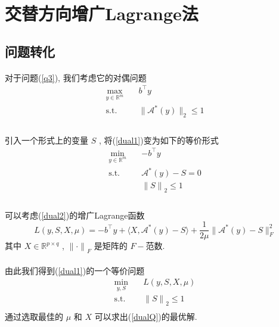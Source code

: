 \documentclass[a4paper, UTF8]{ctexart}				%
\numberwithin{equation}{section}				%
\begin{document}
	\section{交替方向增广Lagrange法}
		\subsection{问题转化}
			\paragraph{}
				\quad 对于问题(\ref{q3}), 我们考虑它的对偶问题
				\begin{equation}
					\begin{split}\label{dual1}
						\max_{y \in \mathbb{R}^{m}} \quad
							& b^\top y\\
						\text{s.t.} \quad
							& \lVert{\mathcal{A}^*(y)}\rVert_2 \le 1\\
					\end{split}
				\end{equation}

			\paragraph{}
				\quad 引入一个形式上的变量 $S$ , 将(\ref{dual1})变为如下的等价形式
				\begin{equation}
					\begin{split}\label{dual2}
						\min_{y \in \mathbb{R}^{m}} \quad
							& -b^\top y\\
						\text{s.t.} \quad
							& \mathcal{A}^*(y) - S = 0\\
							& {\lVert{S}\rVert}_2 \le 1\\
					\end{split}
				\end{equation}

			\paragraph{}
				\quad 可以考虑(\ref{dual2})的增广Lagrange函数
				\begin{equation}\label{Lag}
						L(y, S, X, \mu)
					=	-b^\top y + \langle{X, \mathcal{A}^*(y) - S}\rangle + \frac{1}{2\mu} \lVert{\mathcal{A}^*(y) - S}\rVert^2_F
				\end{equation}
				其中 $X \in \mathbb{R}^{p \times q}$ , ${\lVert{\cdot}\rVert}_F$ 是矩阵的 $F-$范数.

			\paragraph{}
				\quad 由此我们得到(\ref{dual1})的一个等价问题
				\begin{equation}
					\begin{split}\label{dualQ}
						\min_{y,S} \quad
							& L(y, S, X, \mu)\\
						\text{s.t.} \quad
							& {\lVert{S}\rVert}_2 \le 1\\
					\end{split}
				\end{equation}
				通过选取最佳的 $\mu$ 和 $X$ 可以求出(\ref{dualQ})的最优解.
\end{document}

